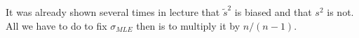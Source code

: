 
It was already shown several times in lecture that $\tilde{s}^2$ is biased and that $s^2$ is not.
All we have to do to fix $\sigma_{MLE}$ then is to multiply it by $n/(n-1)$.
